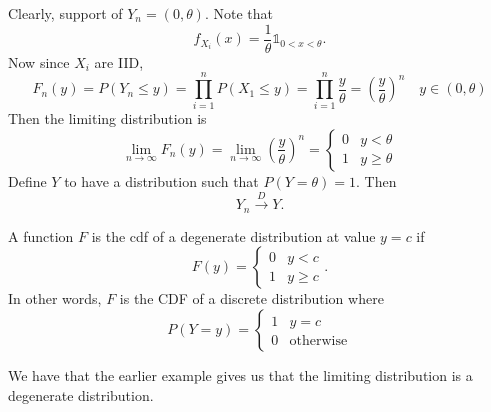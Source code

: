 \documentclass[notoc,notitlepage]{tufte-book}
\newcommand{\convd}{\overset{D}{\to}}
\begin{document}
\begin{solution}
  Clearly, support of $Y_n = ( 0, \theta )$. Note that
  \begin{equation*}
    f_{X_i}(x) = \frac{1}{\theta} \mathbb{1}_{0 < x < \theta}.
  \end{equation*}
  Now since $X_i$ are IID,
  \begin{equation*}
    F_n (y) = P(Y_n \leq y) = \prod_{i=1}^{n} P( X_1 \leq y ) = \prod_{i=1}^{n} \frac{y}{\theta} = \left( \frac{y}{\theta} \right)^n \quad y \in ( 0, \theta )
  \end{equation*}
  Then the limiting distribution is
  \begin{equation*}
    \lim_{n \to \infty} F_n(y) = \lim_{n \to \infty} \left( \frac{y}{\theta} \right)^n = \begin{cases}
      0 & y < \theta \\
      1 & y \geq \theta
    \end{cases}
  \end{equation*}
  Define $Y$ to have a distribution such that $P(Y = \theta) = 1$. Then
  \begin{equation*}
    Y_n \convd Y.
  \end{equation*}
\end{solution}

\begin{defn}
\label{defn:degenerate_distribution}
  A function $F$ is the cdf of a degenerate distribution at value $y = c$ if
  \begin{equation*}
    F(y) = \begin{cases}
      0 & y < c \\
      1 & y \geq c
    \end{cases}.
  \end{equation*}
  In other words, $F$ is the CDF of a discrete distribution where
  \begin{equation*}
    P(Y = y) = \begin{cases}
      1 & y = c \\
      0 & \text{otherwise}
    \end{cases}
  \end{equation*}
\end{defn}

We have that the earlier example gives us that the limiting distribution is a degenerate distribution.

\end{document}
